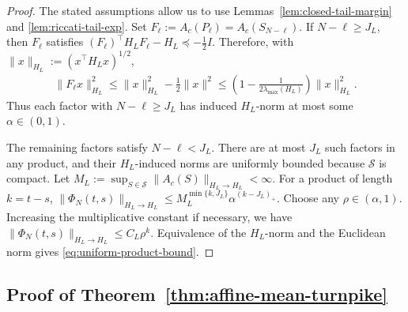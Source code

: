 \documentclass[10pt,journal,twoside]{IEEEtran}
\theoremstyle{definition}
\theoremstyle{remark}
\begin{document}
\begin{proof}
	The stated assumptions allow us to use Lemmas~\ref{lem:closed-tail-margin} and \ref{lem:riccati-tail-exp}.
	Set
	\(
	F_\ell:=A_c(P_\ell)=A_c(S_{N-\ell}).
	\)
	If \(N-\ell\ge J_L\), then \(F_\ell\) satisfies
	\(
	(F_\ell)^\top H_LF_\ell-H_L
	\preceq
	-\frac12 I .
	\)
	Therefore, with \(\|x\|_{H_L}:=(x^\top H_Lx)^{1/2}\),
	\[
	\begin{aligned}
		\|F_\ell x\|_{H_L}^2
		\le
		\|x\|_{H_L}^2-\frac12\|x\|^2 \le
		\left(1-\frac{1}{2\lambda_{\max}(H_L)}\right)
		\|x\|_{H_L}^2 .
	\end{aligned}
	\]
	Thus each factor with \(N-\ell\ge J_L\) has induced \(H_L\)-norm at most
	some \(\alpha\in(0,1)\).
	
	The remaining factors satisfy \(N-\ell<J_L\). There are at most \(J_L\)
	such factors in any product, and their \(H_L\)-induced norms are uniformly
	bounded because \(\mathscr S\) is compact. Let
	\(
	M_L:=\sup_{S\in\mathscr S}\|A_c(S)\|_{H_L\to H_L}<\infty .
	\)
	For a product of length \(k=t-s\), $\|\Phi_N(t,s)\|_{H_L\to H_L}
		\le
		M_L^{\min\{k,J_L\}}\alpha^{(k-J_L)_+}$.
	Choose any \(\rho\in(\alpha,1)\). Increasing the multiplicative
	constant if necessary, we have
	$\|\Phi_N(t,s)\|_{H_L\to H_L}
	\le
	C_L\rho^k$.
	Equivalence of the \(H_L\)-norm and the Euclidean norm gives
	\eqref{eq:uniform-product-bound}. 
\end{proof}




\subsection{Proof of Theorem~\ref{thm:affine-mean-turnpike}}
\label{app:thm2}
\end{document}
